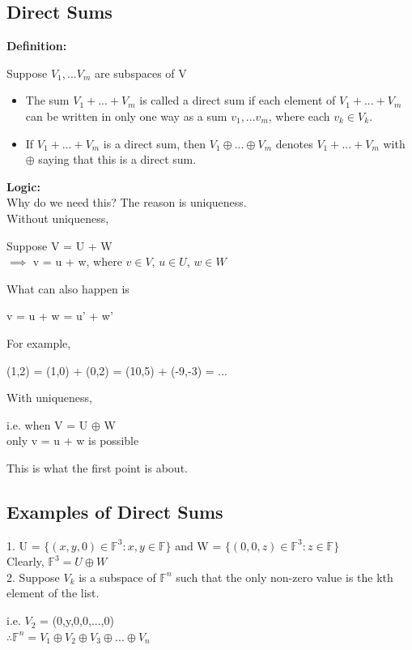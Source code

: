 \documentclass{article}
\begin{document}
\subsection{Direct Sums}
\textbf{Definition:}
\begin{center}
    Suppose $V_1,...V_m$ are subspaces of V
    \begin{itemize}
        \item The sum $V_1+...+V_m$ is called a direct sum if each element of $V_1+...+V_m$ can be written in only one way as a sum $v_1,...v_m$, where each $v_k \in V_k$.
        \item If $V_1+...+V_m$ is a direct sum, then $V_1\oplus...\oplus V_m$ denotes $V_1+...+V_m$ with $\oplus$ saying that this is a direct sum.
    \end{itemize}
\end{center}
\textbf{Logic:} \\
Why do we need this? The reason is uniqueness. \\
Without uniqueness, 
\begin{center}
    Suppose V = U + W \\
    $\implies$ v = u + w, where $v \in V$, $u \in U$, $w \in W$ 
\end{center}
What can also happen is 
\begin{center}
    v = u + w = u' + w'
\end{center}
For example, 
\begin{center}
    (1,2) = (1,0) + (0,2) = (10,5) + (-9,-3) = ...
\end{center}
With uniqueness, 
\begin{center}
    i.e. when V = U $\oplus$ W \\
    only v = u + w is possible 
\end{center}
This is what the first point is about. 
\subsection{Examples of Direct Sums}
1. U = $\{(x,y,0)\in \mathbb{F}^3: x,y \in \mathbb{F}\}$ and W = $\{(0,0,z) \in \mathbb{F}^3: z \in \mathbb{F}\}$ \\
Clearly, $\mathbb{F}^3 = U \oplus W$ \\
2. Suppose $V_k$ is a subspace of $\mathbb{F}^n$ such that the only non-zero value is the kth element of the list. \\
\begin{center}
    i.e. $V_2$ = (0,y,0,0,...,0) \\
    $\therefore \mathbb{F}^n = V_1 \oplus V_2 \oplus V_3 \oplus ... \oplus V_n$ 
\end{center}
\end{document}
